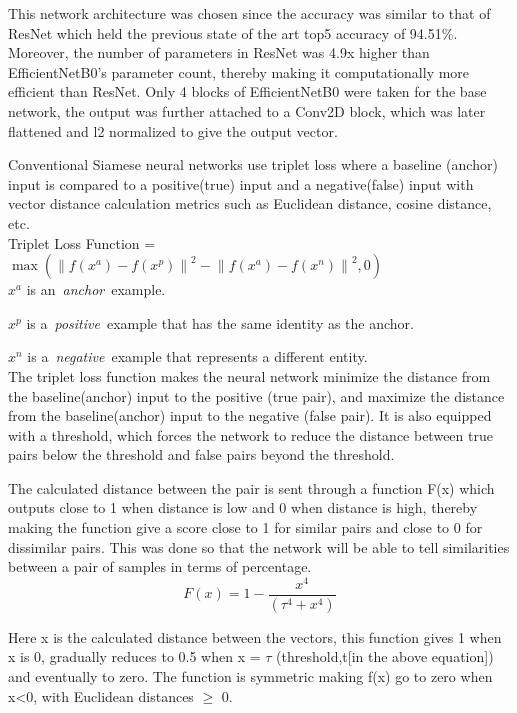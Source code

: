 \documentclass[10pt,twocolumn]{article}
\begin{document}
This network architecture was chosen since the accuracy was similar to that of ResNet which held the previous state of the art top5 accuracy of 94.51\%. Moreover, the number of parameters in ResNet was 4.9x higher than EfficientNetB0’s parameter count, thereby making it computationally more efficient than ResNet. Only 4 blocks of EfficientNetB0 were taken for the base network, the output was further attached to a Conv2D block, which was later flattened and l2 normalized to give the output vector.

Conventional Siamese neural networks use triplet loss where a baseline (anchor) input is compared to a positive(true) input and a negative(false) input with vector distance calculation metrics such as Euclidean distance, cosine distance, etc.
\\


Triplet Loss Function =
\(\max\left( {\| f\left( x^{a} \right) - f\left( x^{p} \right) \|}^{2} - {\| f\left( x^{a} \right) - f\left( x^{n} \right) \|}^{2},0 \right)\)
\\

\(x^{a}\) is an~\emph{anchor}~example.

\(x^{p}\) is a~\emph{positive}~example that has the same identity as the anchor.

\(x^{n}\) is a~\emph{negative}~example that represents a different
entity.
\\


The triplet loss function makes the neural network minimize the distance from the baseline(anchor) input to the positive (true pair), and maximize the distance from the baseline(anchor) input to the negative (false pair). It is also equipped with a threshold, which forces the network to reduce the distance between true pairs below the threshold and false pairs beyond the threshold.

The calculated distance between the pair is sent through a function F(x) which outputs close to 1 when distance is low and 0 when distance is high, thereby making the function give a score close to 1 for similar pairs and close to 0 for dissimilar pairs. This was done so that the network will be able to tell similarities between a pair of samples in terms of percentage. 
\[F\left( x \right) = 1 - \frac{x^{4}}{({\tau}^{4}+x^{4})}\]


Here x is the calculated distance between the vectors, this function gives 1 when x is 0, gradually reduces to 0.5 when x = $\tau$ (threshold,t[in the above equation]) and eventually to zero. The function is symmetric making f(x) go to zero when x\textless0, with Euclidean distances $\ge$ 0.
\end{document}
